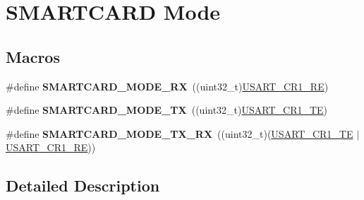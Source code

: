 \hypertarget{group___s_m_a_r_t_c_a_r_d___mode}{}\section{S\+M\+A\+R\+T\+C\+A\+RD Mode}
\label{group___s_m_a_r_t_c_a_r_d___mode}
\subsection*{Macros}
\begin{DoxyCompactItemize}
\item 
\#define {\bfseries S\+M\+A\+R\+T\+C\+A\+R\+D\+\_\+\+M\+O\+D\+E\+\_\+\+RX}~((uint32\+\_\+t)\hyperlink{group___peripheral___registers___bits___definition_gada0d5d407a22264de847bc1b40a17aeb}{U\+S\+A\+R\+T\+\_\+\+C\+R1\+\_\+\+RE})\hypertarget{group___s_m_a_r_t_c_a_r_d___mode_ga88cae88197abe0d85a82c6335454ab84}{}\label{group___s_m_a_r_t_c_a_r_d___mode_ga88cae88197abe0d85a82c6335454ab84}

\item 
\#define {\bfseries S\+M\+A\+R\+T\+C\+A\+R\+D\+\_\+\+M\+O\+D\+E\+\_\+\+TX}~((uint32\+\_\+t)\hyperlink{group___peripheral___registers___bits___definition_gade7f090b04fd78b755b43357ecaa9622}{U\+S\+A\+R\+T\+\_\+\+C\+R1\+\_\+\+TE})\hypertarget{group___s_m_a_r_t_c_a_r_d___mode_ga32859d392982097d1c2c95cd7332bcf7}{}\label{group___s_m_a_r_t_c_a_r_d___mode_ga32859d392982097d1c2c95cd7332bcf7}

\item 
\#define {\bfseries S\+M\+A\+R\+T\+C\+A\+R\+D\+\_\+\+M\+O\+D\+E\+\_\+\+T\+X\+\_\+\+RX}~((uint32\+\_\+t)(\hyperlink{group___peripheral___registers___bits___definition_gade7f090b04fd78b755b43357ecaa9622}{U\+S\+A\+R\+T\+\_\+\+C\+R1\+\_\+\+TE} $\vert$\hyperlink{group___peripheral___registers___bits___definition_gada0d5d407a22264de847bc1b40a17aeb}{U\+S\+A\+R\+T\+\_\+\+C\+R1\+\_\+\+RE}))\hypertarget{group___s_m_a_r_t_c_a_r_d___mode_gac481921bcb3a053264f1ddc92164bda6}{}\label{group___s_m_a_r_t_c_a_r_d___mode_gac481921bcb3a053264f1ddc92164bda6}

\end{DoxyCompactItemize}


\subsection{Detailed Description}
